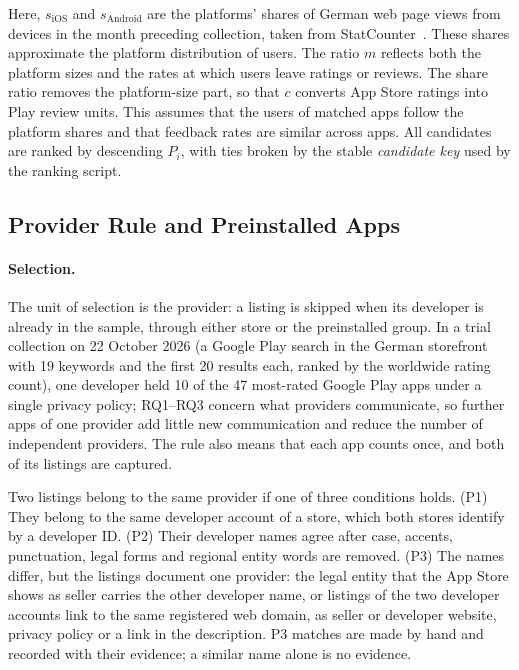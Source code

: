 Here, $s_{\mathrm{iOS}}$ and $s_{\mathrm{Android}}$ are the platforms' shares of
German web page views from devices in the month preceding collection, taken from
StatCounter~\parencite{statcounter2026os}. These shares approximate the
platform distribution of users. The ratio $m$ reflects both the platform sizes
and the rates at which users leave ratings or reviews. The share ratio removes
the platform-size part, so that $c$ converts App Store ratings into Play review
units. This assumes that the users of matched apps follow the platform shares
and that feedback rates are similar across apps. All candidates are ranked by descending $P_i$, with ties broken by the stable
\emph{candidate key} used by the ranking script.

\subsection{Provider Rule and Preinstalled Apps}
\label{sec:selection}
\paragraph{Selection.} The unit of selection is the provider: a listing is skipped when its
developer is already in the sample, through either store or the preinstalled group. In a
trial collection on 22 October 2026 (a Google Play search in the German storefront
with 19 keywords and the first 20 results each, ranked by the worldwide rating count), one
developer held 10 of the 47 most-rated Google Play apps under a single privacy policy;
RQ1--RQ3 concern what providers communicate, so further apps of one provider add little new
communication and reduce the number of independent providers. The rule also means that each app
counts once, and both of its listings are captured.

Two listings belong to the same provider if one of three conditions holds.
(P1) They belong to the same developer account of a store, which both stores
identify by a developer ID\@. (P2) Their developer names agree after case,
accents, punctuation, legal forms and regional entity words are removed.
(P3) The names differ, but the listings document one provider: the legal entity
that the App Store shows as seller carries the other developer name, or
listings of the two developer accounts link to the same registered web domain,
as seller or developer website, privacy policy or a link in the description.
P3 matches are made by hand and recorded with their evidence; a similar name alone is no
evidence.

